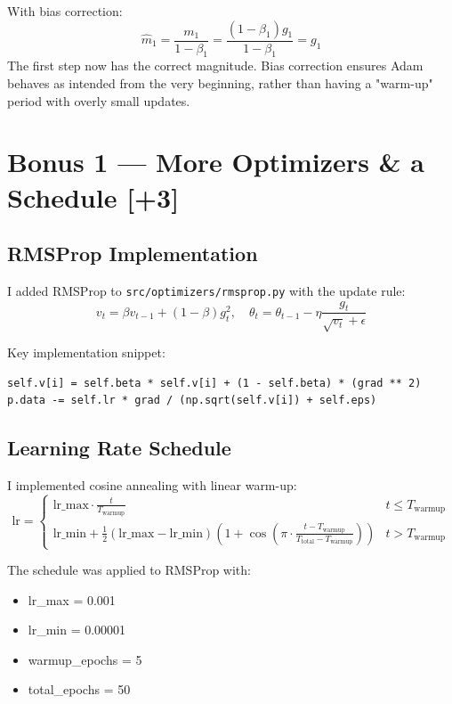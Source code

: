 \documentclass[11pt,a4paper]{article}
\begin{document}
With bias correction:
\[
\hat{m}_1 = \frac{m_1}{1-\beta_1} = \frac{(1-\beta_1)g_1}{1-\beta_1} = g_1
\]
The first step now has the correct magnitude. Bias correction ensures Adam behaves as intended from the very beginning, rather than having a "warm-up" period with overly small updates.

\section*{Bonus 1 --- More Optimizers \& a Schedule [+3]}

\subsection*{RMSProp Implementation}

I added RMSProp to \texttt{src/optimizers/rmsprop.py} with the update rule:
\[
v_t = \beta v_{t-1} + (1-\beta)g_t^2, \quad
\theta_t = \theta_{t-1} - \eta \frac{g_t}{\sqrt{v_t} + \epsilon}
\]

Key implementation snippet:
\begin{verbatim}
self.v[i] = self.beta * self.v[i] + (1 - self.beta) * (grad ** 2)
p.data -= self.lr * grad / (np.sqrt(self.v[i]) + self.eps)
\end{verbatim}

\subsection*{Learning Rate Schedule}

I implemented cosine annealing with linear warm-up:
\[
\text{lr} =
\begin{cases}
\text{lr\_max} \cdot \frac{t}{T_{\text{warmup}}} & t \leq T_{\text{warmup}} \\
\text{lr\_min} + \frac{1}{2}(\text{lr\_max} - \text{lr\_min})(1 + \cos(\pi \cdot \frac{t - T_{\text{warmup}}}{T_{\text{total}} - T_{\text{warmup}}})) & t > T_{\text{warmup}}
\end{cases}
\]

The schedule was applied to RMSProp with:
\begin{itemize}
    \item lr\_max = 0.001
    \item lr\_min = 0.00001
    \item warmup\_epochs = 5
    \item total\_epochs = 50
\end{itemize}
\end{document}
